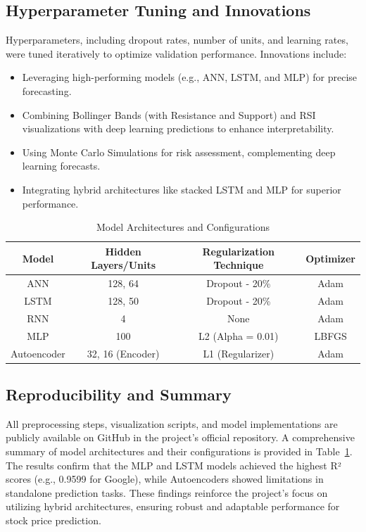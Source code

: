\documentclass[conference]{IEEEtran}
\begin{document}
\subsection{Hyperparameter Tuning and Innovations}
Hyperparameters, including dropout rates, number of units, and learning rates, were tuned iteratively to optimize validation performance. Innovations include:
\begin{itemize}
    \item Leveraging high-performing models (e.g., ANN, LSTM, and MLP) for precise forecasting.
    \item Combining Bollinger Bands (with Resistance and Support) and RSI visualizations with deep learning predictions to enhance interpretability.
    \item Using Monte Carlo Simulations for risk assessment, complementing deep learning forecasts.
    \item Integrating hybrid architectures like stacked LSTM and MLP for superior performance.
\end{itemize}

\begin{table}[h!]
\centering
\caption{Model Architectures and Configurations}
\label{tab:model_summary}
\begin{tabular}{|c|c|c|c|}
\hline
\textbf{Model} & \textbf{Hidden Layers/Units} & \textbf{Regularization Technique} & \textbf{Optimizer} \\ \hline
ANN            & 128, 64                      & Dropout - 20\%               & Adam               \\ \hline
LSTM           & 128, 50                      & Dropout - 20\%               & Adam               \\ \hline
RNN            & 4                            & None                         & Adam               \\ \hline
MLP            & 100                          & L2 (Alpha = 0.01)            & LBFGS              \\ \hline
Autoencoder    & 32, 16 (Encoder)             & L1 (Regularizer)            & Adam               \\ \hline
\end{tabular}
\end{table}


\subsection{Reproducibility and Summary}
All preprocessing steps, visualization scripts, and model implementations are publicly available on GitHub in the project's official repository. A comprehensive summary of model architectures and their configurations is provided in Table~\ref{tab:model_summary}. The results confirm that the MLP and LSTM models achieved the highest R² scores (e.g., 0.9599 for Google), while Autoencoders showed limitations in standalone prediction tasks. These findings reinforce the project's focus on utilizing hybrid architectures, ensuring robust and adaptable performance for stock price prediction.
\end{document}
